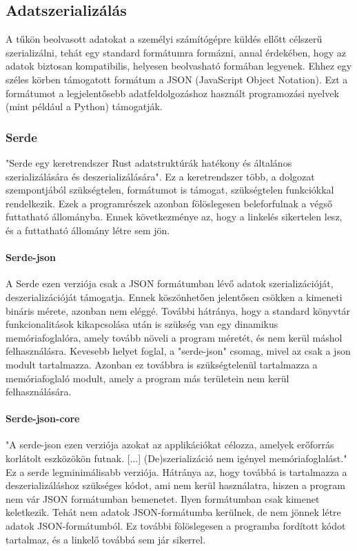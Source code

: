 \subsection{Adatszerializálás}
A tűkön beolvasott adatokat a személyi számítógépre küldés ellőtt célszerű szerializálni, tehát egy standard formátumra formázni, annal érdekében, hogy az adatok biztosan kompatibilis, helyesen beolvasható formában legyenek.
Ehhez egy széles körben támogatott formátum a JSON (JavaScript Object Notation).
Ezt a formátumot a legjelentősebb adatfeldolgozáshoz használt programozási nyelvek (mint például a Python) támogatják.

\subsubsection{Serde}
"Serde egy keretrendszer Rust adatstruktúrák hatékony és általános szerializálására és deszerializálására"\cite{serde_rust}.
Ez a keretrendszer több, a dolgozat szempontjából szükségtelen, formátumot is támogat, szükségtelen funkciókkal rendelkezik.
Ezek a programrészek azonban fölöslegesen beleforfulnak a végső futtatható állományba.
Ennek következménye az, hogy a linkelés sikertelen lesz, és a futtatható állomány létre sem jön.

\paragraph{Serde-json}
A Serde ezen verziója csak a JSON formátumban lévő adatok szerializációját, deszerializációját támogatja\cite{serde_json_rust}.
Ennek köszönhetően jelentősen csökken a kimeneti bináris mérete, azonban nem eléggé. További hátránya, hogy a standard könyvtár funkcionalitások kikapcsolása után is szükség van egy dinamikus memóriafoglalóra\cite{serde_json_rust}, amely tovább növeli a program méretét, és nem kerül máshol felhasználásra.
Kevesebb helyet foglal, a "serde-json" csomag, mivel az csak a json modult tartalmazza.
Azonban ez továbbra is szükségtelenül tartalmazza a memóriafoglaló modult, amely a program más területein nem kerül felhasználására.
\paragraph{Serde-json-core} "A serde-json ezen verziója azokat az applikációkat célozza, amelyek erőforrás korlátolt eszközökön futnak. [...]
(De)szerializáció nem igényel memóriafoglalást."\cite{serde_json_core_rust}
Ez a serde legminimálisabb verziója.
Hátránya az, hogy továbbá is tartalmazza a deszerializáláshoz szükséges kódot, ami nem kerül használatra, hiszen a program nem vár JSON formátumban bemenetet.
Ilyen formátumban csak kimenet keletkezik.
Tehát nem adatok JSON-formátumba kerülnek, de nem jönnek létre adatok JSON-formátumból.
Ez további fölöslegesen a programba fordított kódot tartalmaz, és a linkelő továbbá sem jár sikerrel.

